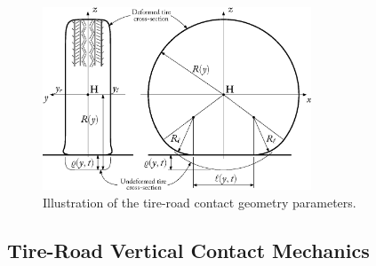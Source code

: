 \begin{figure}[htb]
  \centering
  \includegraphics[width=8.0cm]{figures/appendix_3/belt_section}
  \caption{Illustration of the tire-road contact geometry parameters.}
  \label{app3:fig:belt_section}
\end{figure}


\subsection{Tire-Road Vertical Contact Mechanics}
\label{app3:sec:vertical_contact}

